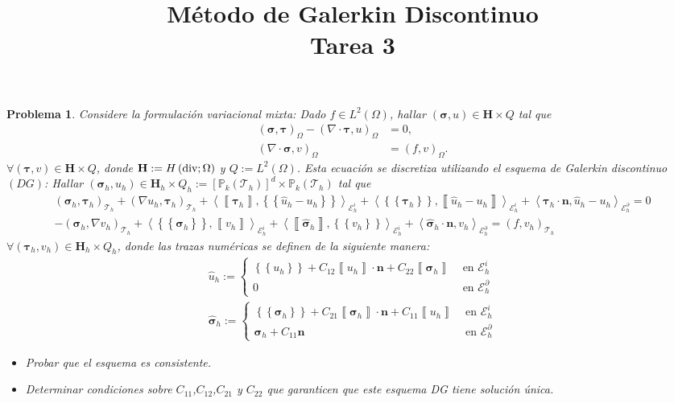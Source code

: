 \documentclass[10pt,a4paper]{report}
\title{\color{azul}\textbf{Método de Galerkin Discontinuo}\\
	\textbf{Tarea 3}}
\author{\color{azul}\autor}
\date{\color{azul}\fecha}
\newtheorem{pro}{Problema}
\newcommand{\bs}{\boldsymbol}
\newcommand{\Th}{\mathscr{T}_{h}}
\newcommand{\Hdiv}{H\left(\textup{div};\Omega\right)}
\providecommand{\E}[1]{\mathscr{E}^{#1}_{h}}
\providecommand{\salto}[1]{\left\llbracket#1\right\rrbracket}
\providecommand{\prom}[1]{\left \{\!\left \{#1\right \}\!\right \}}
\providecommand{\PI}[2]{\left\langle #1,#2  \right\rangle}
\providecommand{\Pii}[2]{\left( #1,#2  \right)}
\begin{document}
	\begin{pro}
		Considere la formulación variacional mixta: Dado $f\in L^{2}\left(\Omega\right)$, hallar $(\bs{\sigma},u)\in \textbf{H}\times Q$ tal que
		\begin{align*}
			\Pii{\bs{\sigma}}{\bs{\tau}}_{\Omega} - \Pii{\nabla\cdot \bs{\tau}}{u}_{\Omega} &= 0,\\
			\Pii{\nabla\cdot \bs{\sigma}}{v}_{\Omega} &= \Pii{f}{v}_{\Omega}. 
		\end{align*} 
	    $\forall \Pii{\bs{\tau}}{v}\in \textbf{H}\times Q$, donde $\textbf{H}:= \Hdiv$ y $Q := L^{2}(\Omega)$. Esta ecuación se discretiza utilizando el esquema de Galerkin discontinuo $(DG)$: Hallar $\Pii{\bs{\sigma}_{h}}{u_{h}}\in \textbf{H}_{h}\times Q_{h} := \left[\mathbb{P}_{k}\left(\Th\right)\right]^{d}\times \mathbb{P}_{k}(\Th)$ tal que 
	    \begin{align*}
	    \Pii{\bs{\sigma}_{h}}{\bs{\tau}_{h}}_{\Th} + \Pii{\nabla u_{h}}{\bs{\tau}_{h}}_{\Th} + \PI{\salto{\bs{\tau}_{h}}}{\prom{\hat{u}_{h}-u_{h}}}_{\E{i}} + \PI{\prom{\bs{\tau}_{h}}}{\salto{\hat{u}_{h}-u_{h}}}_{\E{i}} + \PI{\bs{\tau}_{h}\cdot \textbf{n}}{\hat{u}_{h}-u_{h}}_{\E{\partial}} = 0\\
	    -\Pii{\bs{\sigma}_{h}}{\nabla v_{h}}_{\Th} + \PI{\prom{\hat{\bs{\sigma}}_{h}}}{\salto{v_{h}}}_{\E{i}} + \PI{\salto{\hat{\bs{\sigma}}_{h}}}{\prom{v_{h}}}_{\E{i}} + \PI{\hat{\bs{\sigma}}_{h}\cdot \textbf{n}}{v_{h}}_{\E{\partial}} = \Pii{f}{v_{h}}_{\Th}
	    \end{align*}
    $\forall \Pii{\bs{\tau}_{h}}{v_{h}}\in \textbf{H}_{h}\times Q_{h}$, donde las trazas numéricas se definen de la siguiente manera:
    \begin{align*}
    	\hat{u}_{h} := \begin{cases}
    		\prom{u_{h}} + C_{12}\salto{u_{h}}\cdot \textbf{n} + C_{22}\salto{\bs{\sigma}_{h}} & \text{ en } \E{i} \\ 
    		0 & \text{ en } \E{\partial}
    	\end{cases} \\
        \hat{\bs{\sigma}}_{h} := \begin{cases}
        	\prom{\bs{\sigma}_{h}} + C_{21}\salto{\bs{\sigma}_{h}}\cdot \textbf{n} + C_{11}\salto{u_{h}} & \text{ en } \E{i} \\ 
        	\bs{\sigma}_{h} + C_{11}\textbf{n} & \text{ en } \E{\partial}
        \end{cases}
    \end{align*}
    \begin{itemize}
    	\item[($a$)] Probar que el esquema es consistente.
    	\item[($b$)] Determinar condiciones sobre $C_{11}$,$C_{12}$,$C_{21}$ y $C_{22}$ que garanticen que este esquema DG tiene
    	solución única.
    \end{itemize}
	\end{pro}
\end{document}
